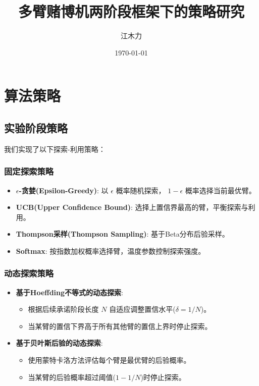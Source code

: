\documentclass[8pt, a4paper]{ctexart} %
\title{多臂赌博机两阶段框架下的策略研究}
\author{江木力}
\date{\today} %
\newcommand{\N}{\ensuremath{N}}
\newcommand{\eps}{\ensuremath{\epsilon}} %
\newcommand{\deltaVal}{\ensuremath{\delta}}
\begin{document}
\maketitle

\section{算法策略}

\subsection{实验阶段策略}

我们实现了以下探索-利用策略：

\subsubsection{固定探索策略}
\begin{itemize}
    \item \textbf{$\eps$-贪婪(Epsilon-Greedy)}: 以 $\eps$ 概率随机探索， $1-\eps$ 概率选择当前最优臂。
    \item \textbf{UCB(Upper Confidence Bound)}: 选择上置信界最高的臂，平衡探索与利用。
    \item \textbf{Thompson采样(Thompson Sampling)}: 基于Beta分布后验采样。
    \item \textbf{Softmax}: 按指数加权概率选择臂，温度参数控制探索强度。
\end{itemize}

\subsubsection{动态探索策略}
\begin{itemize}
    \item \textbf{基于Hoeffding不等式的动态探索}:
        \begin{itemize}
            \item 根据后续承诺阶段长度 $\N$ 自适应调整置信水平($\deltaVal = 1/\N$)。
            \item 当某臂的置信下界高于所有其他臂的置信上界时停止探索。
        \end{itemize}
    \item \textbf{基于贝叶斯后验的动态探索}:
        \begin{itemize}
            \item 使用蒙特卡洛方法评估每个臂是最优臂的后验概率。
            \item 当某臂的后验概率超过阈值($1-1/\N$)时停止探索。
        \end{itemize}
\end{itemize}
\end{document}
